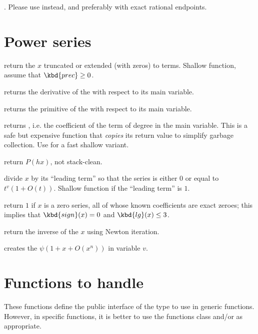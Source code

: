 
. Please use 
instead, and preferably  with exact rational endpoints.

\section{Power series}

 return the  $x$ truncated
or extended (with zeros) to  terms. Shallow function, assume
that $\kbd{prec} \geq 0$.

 returns the derivative of the  
with respect to its main variable.

 returns the primitive of the  
with respect to its main variable.

 returns , i.e.
the coefficient of the term of degree  in the main variable. This is a
safe but expensive function that \emph{copies} its return value to simplify
garbage collection. Use  for a fast shallow variant.

 return $P(h x)$, not stack-clean.

 divide $x$ by its ``leading term'' so that
the series is either $0$ or equal to $t^v(1+O(t))$. Shallow function if the
``leading term'' is $1$.

 return $1$ if $x$ is a zero series, all
of whose known coefficients are exact zeroes; this implies that
$\kbd{sign}(x) = 0$ and $\kbd{lg}(x) \leq 3$.

 return the inverse of the  $x$ using
Newton iteration.

 creates the 
$\psi(1 + x + O(x^n))$ in variable $v$.

\section{Functions to handle }
These functions define the public interface of the  type to use in
generic functions.  However, in specific functions, it is better to use the
functions class  and/or  as appropriate.


